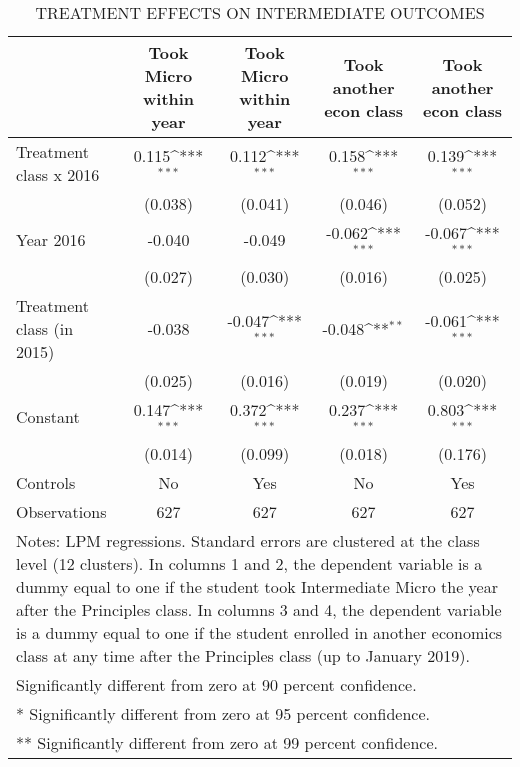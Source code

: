 \begin{table}[]
\caption{TREATMENT EFFECTS ON INTERMEDIATE OUTCOMES}
{
\def\sym#1{\ifmmode^{#1}\else\(^{#1}\)\fi}
\begin{tabular}{@{\extracolsep{2pt}}l*{4}{c}@{}}
\hline\hline


 & Took Micro within year & Took Micro within year & Took another econ class & Took another econ class \\
\hline
Treatment class x 2016 & 0.115\sym{***} & 0.112\sym{***} & 0.158\sym{***} & 0.139\sym{***} \\
 & (0.038) & (0.041) & (0.046) & (0.052) \\
Year 2016 & -0.040 & -0.049 & -0.062\sym{***} & -0.067\sym{***} \\
 & (0.027) & (0.030) & (0.016) & (0.025) \\
Treatment class (in 2015) & -0.038 & -0.047\sym{***} & -0.048\sym{**} & -0.061\sym{***} \\
 & (0.025) & (0.016) & (0.019) & (0.020) \\
Constant & 0.147\sym{***} & 0.372\sym{***} & 0.237\sym{***} & 0.803\sym{***} \\
 & (0.014) & (0.099) & (0.018) & (0.176) \\
Controls & No & Yes & No & Yes \\

\hline
Observations & 627 & 627 & 627 & 627 \\
\hline\hline
\multicolumn{5}{l}{\footnotesize Notes: LPM regressions. Standard errors are clustered at the class level (12 clusters). In columns 1 and 2, the dependent variable is a dummy equal to one if the student took Intermediate Micro the year after the Principles class. In columns 3 and 4, the dependent variable is a dummy equal to one if the student enrolled in another economics class at any time after the Principles class (up to January 2019).}\vspace{-.25em} \\
\multicolumn{5}{l}{\footnotesize * Significantly different from zero at 90 percent confidence.}\vspace{-.25em} \\
\multicolumn{5}{l}{\footnotesize ** Significantly different from zero at 95 percent confidence.}\vspace{-.25em} \\
\multicolumn{5}{l}{\footnotesize *** Significantly different from zero at 99 percent confidence.}
\end{tabular}
}
\end{table}